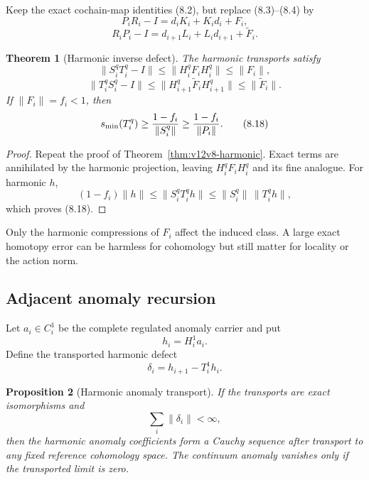 \documentclass[11pt]{article}
\newtheorem{theorem}{Theorem}[section]
\newtheorem{proposition}[theorem]{Proposition}
\theoremstyle{remark}
\begin{document}
Keep the exact cochain-map identities (8.2), but replace (8.3)--(8.4)
by
\[
 P_iR_i-I=d_iK_i+K_id_i+F_i,                                \tag{8.14}
\]
\[
 R_iP_i-I=d_{i+1}L_i+L_id_{i+1}+\widetilde F_i.             \tag{8.15}
\]

\begin{theorem}[Harmonic inverse defect]
\label{thm:v12v8-homotopy-defect}
The harmonic transports satisfy
\[
 \|S_i^qT_i^q-I\|\le\|H_i^qF_iH_i^q\|\le\|F_i\|,            \tag{8.16}
\]
\[
 \|T_i^qS_i^q-I\|
       \le\|H_{i+1}^q\widetilde F_iH_{i+1}^q\|
       \le\|\widetilde F_i\|.                               \tag{8.17}
\]
If \(\|F_i\|=f_i<1\), then
\[
                              s_{\min}(T_i^q)
                         \ge{1-f_i\over\|S_i^q\|}
                         \ge{1-f_i\over\|P_i\|}.             \tag{8.18}
\]
\end{theorem}

\begin{proof}
Repeat the proof of Theorem~\ref{thm:v12v8-harmonic}.  Exact terms are
annihilated by the harmonic projection, leaving
\(H_i^qF_iH_i^q\) and its fine analogue.  For harmonic \(h\),
\[
 (1-f_i)\|h\|
 \le\|S_i^qT_i^qh\|
 \le\|S_i^q\|\,\|T_i^qh\|,
\]
which proves (8.18).
\end{proof}

Only the harmonic compressions of \(F_i\) affect the induced class.
A large exact homotopy error can be harmless for cohomology but still
matter for locality or the action norm.

\subsection{Adjacent anomaly recursion}

Let \(a_i\in C_i^1\) be the complete regulated anomaly carrier and
put
\[
                              h_i=H_i^1a_i.                  \tag{8.19}
\]
Define the transported harmonic defect
\[
                              \delta_i
 =h_{i+1}-T_i^1h_i.                                         \tag{8.20}
\]

\begin{proposition}[Harmonic anomaly transport]
\label{prop:v12v8-anomaly}
If the transports are exact isomorphisms and
\[
                              \sum_i\|\delta_i\|<\infty,     \tag{8.21}
\]
then the harmonic anomaly coefficients form a Cauchy sequence after
transport to any fixed reference cohomology space.  The continuum
anomaly vanishes only if the transported limit is zero.
\end{proposition}
\end{document}
